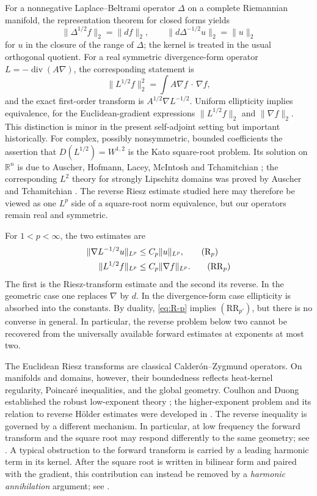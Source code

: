 \documentclass[12pt]{amsart}
\newcommand\R{\mathbb{R}}
\newcommand{\cdo}{\, \cdot \,}
\newcommand{\diver}{\operatorname{div}}
\theoremstyle{remark}
\begin{document}
For a nonnegative Laplace--Beltrami operator $\Delta$ on a complete
Riemannian manifold, the representation theorem for closed forms yields
\[
 \|\Delta^{1/2}f\|_2=\|df\|_2,
 \qquad
 \|d\Delta^{-1/2}u\|_2=\|u\|_2
\]
for $u$ in the closure of the range of $\Delta$; the kernel is treated in
the usual orthogonal quotient. For a real symmetric divergence-form operator $L=-\diver(A\nabla)$, the corresponding statement is
\[
 \|L^{1/2}f\|_2^2
   =\int A\nabla f\mathbin{\cdo}\nabla f,
\]
and the exact first-order transform is $A^{1/2}\nabla L^{-1/2}$.  Uniform
ellipticity implies equivalence, for the
Euclidean-gradient expressions $\|L^{1/2}f\|_2$ and $\|\nabla f\|_2$.
This distinction is minor in the present self-adjoint setting but important
historically.  For
complex, possibly nonsymmetric, bounded coefficients the assertion that
$D(L^{1/2})=W^{1,2}$ is the Kato square-root problem.  Its solution on
$\R^n$ is due to Auscher, Hofmann, Lacey, McIntosh and Tchamitchian
\cite{AHLMT02}; the corresponding $L^2$ theory for strongly Lipschitz
domains was proved by Auscher and Tchamitchian
\cite{AuscherTchamitchian03}.  The reverse Riesz estimate studied here may therefore be viewed as one $L^p$ side of a square-root norm equivalence, but our operators remain real and symmetric.

For $1<p<\infty$, the two estimates are
\begin{align}
 \|\nabla L^{-1/2}u\|_{L^p}&\leq C_p\|u\|_{L^p},
 \tag{$\mathrm R_p$}\label{eq:R-p}\\
 \|L^{1/2}f\|_{L^p}&\leq C_p\|\nabla f\|_{L^p}.
 \tag{$\mathrm{RR}_p$}\label{eq:RR-p}
\end{align}
The first is the Riesz-transform estimate and the second its reverse.  In
the geometric case one replaces $\nabla$ by $d$.  In the divergence-form
case ellipticity is absorbed into the constants.  By duality,
\eqref{eq:R-p} implies \((\mathrm{RR}_{p'})\), but
there is no converse in general.  In particular, the reverse problem below
two cannot be recovered from the universally available forward estimates
at exponents at most two.

The Euclidean Riesz transforms are classical Calder\'on--Zygmund operators.
On manifolds and domains, however, their boundedness reflects heat-kernel
regularity, Poincar\'e inequalities, and the global geometry.  Coulhon and
Duong established the robust low-exponent theory \cite{CoulhonDuong}; the
higher-exponent problem and its relation to reverse H\"older estimates were
developed in \cite{ACDH04,AuscherCoulhon05}.  The reverse
inequality is governed by a different mechanism.  In particular, at low
frequency the forward transform and the square root may respond differently
to the same geometry; see \cite{AuscherCoulhon05,KillipVisanZhang16}.  A
typical obstruction to the forward transform is carried by a leading
harmonic term in its kernel.  After the square root is written in bilinear
form and paired with the gradient, this contribution can instead be removed
by a \emph{harmonic annihilation} argument; see \cite{He26}.
\end{document}
